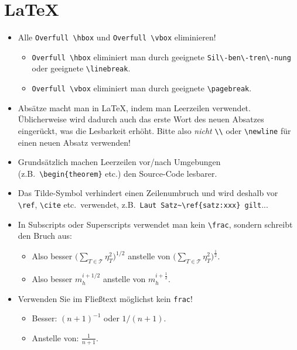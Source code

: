 \section{LaTeX}

{\color{change}
\begin{itemize}

\item Alle \verb$Overfull \hbox$ und \verb$Overfull \vbox$ eliminieren!
\begin{itemize}
\item \verb$Overfull \hbox$ eliminiert man durch geeignete \verb$Sil\-ben\-tren\-nung$ oder geeignete \verb$\linebreak$.
\item \verb$Overfull \vbox$ eliminiert man durch geeignete \verb$\pagebreak$.
\end{itemize}

\item Absätze macht man in \LaTeX, indem man Leerzeilen verwendet. Üblicherweise wird dadurch auch das erste Wort des neuen Absatzes eingerückt, was die Lesbarkeit erhöht. Bitte also \emph{nicht} \verb$\\$ oder \verb$\newline$ für einen neuen Absatz verwenden! 
\item Grundsätzlich machen Leerzeilen vor/nach Umgebungen (z.B.\ \verb$\begin{theorem}$ etc.) den Source-Code lesbarer.
\item Das Tilde-Symbol verhindert einen Zeilenumbruch und wird deshalb vor \verb$\ref$, \verb$\cite$ etc.\ verwendet, z.B.\ \verb$Laut Satz~\ref{satz:xxx} gilt$...

\item In Subscripts oder Superscripts verwendet man kein \verb$\frac$, sondern schreibt den Bruch aus:
\begin{itemize}
\item Also besser $\displaystyle \bigg(\sum_{T \in \mathcal T} \eta_T^2\bigg)^{1/2}$ anstelle von
$\displaystyle \bigg(\sum_{T \in \mathcal T} \eta_T^2\bigg)^{\frac{1}{2}}$.
\item Also besser $m_h^{i+1/2}$ anstelle von $m_h^{i+\frac{1}{2}}$.
\end{itemize}

\item Verwenden Sie im Fließtext möglichst kein \verb$frac$!
\begin{itemize}
\item Besser: $(n+1)^{-1}$ oder $1/(n+1)$.
\item Anstelle von: $\frac{1}{n+1}$.
\end{itemize}


\end{itemize}}
